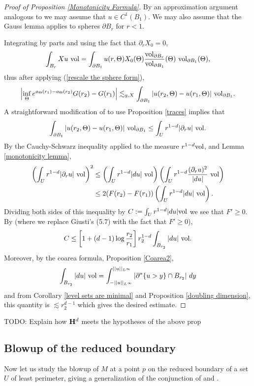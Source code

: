 \begin{proof}[Proof of Proposition \ref{Monotonicity Formula}]
By an approximation argument analogous to \cite[pg68]{Giusti77} we may assume that $u \in C^1(B_1)$.
We may also assume that the Gauss lemma applies to spheres $\partial B_r$ for $r < 1$.

Integrating by parts and using the fact that $\partial_r X_0 = 0$,
$$\int_{B_r} Xu ~\mathrm{vol} = \int_{\partial B_1} u(r, \Theta) X_0(\Theta) \frac{\mathrm{vol}_{\partial B_r}}{\mathrm{vol}_{\partial B_1}}(\Theta) ~\mathrm{vol}_{\partial B_1}(\Theta),$$
thus after applying (\ref{rescale the sphere form}),
$$\left|\inf_\Theta e^{a_\Theta(r_1) - a_\Theta(r_2)}G(r_2) - G(r_1)\right| \lesssim_{g, X} \int_{\partial B_1} |u(r_2, \Theta) - u(r_1, \Theta)| ~\mathrm{vol}_{\partial B_1}.$$
A straightforward modification of \cite[Lemma 5.3]{Giusti77} to use Proposition \ref{traces} implies that
$$\int_{\partial B_1} |u(r_2, \Theta) - u(r_1, \Theta)| ~\mathrm{vol}_{\partial B_1} \leq \int_U r^{1 - d} |\partial_r u| ~\mathrm{vol}.$$
By the Cauchy-Schwarz inequality applied to the measure $r^{1-d}\mathrm{vol}$, and Lemma \ref{monotonicity lemma},
\begin{align*}
\left(\int_U r^{1 - d} |\partial_r u| ~\mathrm{vol} \right)^2 &\leq \left(\int_U r^{1 - d}|du|~\mathrm{vol}\right)\left(\int_U r^{1 - d}\frac{(\partial_ru)^2}{|du|} ~\mathrm{vol}\right)\\
&\leq 2(F(r_2) - F(r_1))\left(\int_U r^{1 - d}|du|~\mathrm{vol}\right).
\end{align*}
Dividing both sides of this inequality by $C := \int_U r^{1 - d} |du|\mathrm{vol}$ we see that $F' \geq 0$.
By \cite[Lemma 5.11]{Giusti77} (where we replace Giusti's (5.7) with the fact that $F' \geq 0$),
$$C \leq \left[1 + (d - 1) \log \frac{r_2}{r_1}\right] r_2^{1 - d} \int_{B_{r_2}} |du| ~\mathrm{vol}.$$
Moreover, by the coarea formula, Proposition \ref{Coarea2},
$$\int_{B_{r_2}} |du| ~\mathrm{vol} = \int_{-||u||_{L^\infty}}^{||u||_{L^\infty}} |\partial^* \{u > y\} \cap B_{r_2}| ~dy$$
and from Corollary \ref{level sets are minimal} and Proposition \ref{doubling dimension}, this quantity is $\lesssim r_2^{d - 1}$ which gives the desired estimate.
\end{proof}

TODO: Explain how $\mathbf H^d$ meets the hypotheses of the above prop



\subsection{Blowup of the reduced boundary}
Now let us study the blowup of $M$ at a point $p$ on the reduced boundary of a set $U$ of least perimeter, giving a generalization of the conjunction of \cite[Theorem 9.3]{Giusti77} and \cite[Theorem 6.2.2]{Simons68}.


